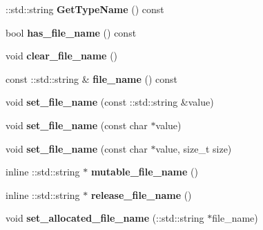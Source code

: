 \begin{DoxyCompactItemize}
\+::std\+::string {\bfseries Get\+Type\+Name} () const
\item 
\mbox{\label{classruntime_1_1FileSendProtos_a0610c08d78461f5689e7805fe6b5f5d8}} 
bool {\bfseries has\+\_\+file\+\_\+name} () const
\item 
\mbox{\label{classruntime_1_1FileSendProtos_ae75e03d2188dc7916aac6ad600044c97}} 
void {\bfseries clear\+\_\+file\+\_\+name} ()
\item 
\mbox{\label{classruntime_1_1FileSendProtos_aadf6f984ad02ca4a5922ac83e986463c}} 
const \+::std\+::string \& {\bfseries file\+\_\+name} () const
\item 
\mbox{\label{classruntime_1_1FileSendProtos_a6fcd1bac32195043a8677e00cc9b36b1}} 
void {\bfseries set\+\_\+file\+\_\+name} (const \+::std\+::string \&value)
\item 
\mbox{\label{classruntime_1_1FileSendProtos_a68b2b6e23ffa06ffc10b7ffd1699d34c}} 
void {\bfseries set\+\_\+file\+\_\+name} (const char $\ast$value)
\item 
\mbox{\label{classruntime_1_1FileSendProtos_a4ee1f94ef39c31c0f3d7a869ee8272da}} 
void {\bfseries set\+\_\+file\+\_\+name} (const char $\ast$value, size\+\_\+t size)
\item 
\mbox{\label{classruntime_1_1FileSendProtos_a2fe6d5fef9354427fc780baf7be62cd6}} 
inline \+::std\+::string $\ast$ {\bfseries mutable\+\_\+file\+\_\+name} ()
\item 
\mbox{\label{classruntime_1_1FileSendProtos_a8ac8a84aa38746fca7e13176e7b3783a}} 
inline \+::std\+::string $\ast$ {\bfseries release\+\_\+file\+\_\+name} ()
\item 
\mbox{\label{classruntime_1_1FileSendProtos_ae4a848d6ec36d9d702b1d7347046b5f7}} 
void {\bfseries set\+\_\+allocated\+\_\+file\+\_\+name} (\+::std\+::string $\ast$file\+\_\+name)
\item 
\mbox{\label{classruntime_1_1FileSendProtos_aa5482fbac6ec3e48a9a75eb0a43721d9}} 

\end{DoxyCompactItemize}
